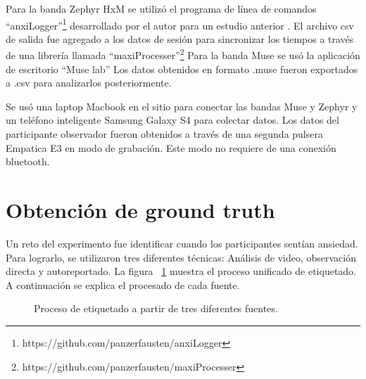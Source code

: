 Para la banda Zephyr HxM se utiliz\'o el programa de l\'inea de comandos ``anxiLogger''\footnote{https://github.com/panzerfausten/anxiLogger} desarrollado por el autor para un estudio anterior \citep{Miranda}. El archivo csv de salida fue agregado a los datos de sesi\'on para sincronizar los tiempos a trav\'es de una librer\'ia llamada ``maxiProcesser''\footnote{https://github.com/panzerfausten/maxiProcesser}
	Para la banda Muse se us\'o la aplicaci\'on de escritorio ``Muse lab'' Los datos obtenidos en formato .muse fueron exportados a .csv para analizarlos posteriormente.

	Se us\'o una laptop Macbook en el sitio para conectar las bandas Muse y Zephyr y un tel\'efono inteligente Samsung Galaxy S4 para colectar datos. Los datos del participante observador fueron obtenidos a trav\'es de una segunda pulsera Empatica E3 en modo de grabaci\'on. Este modo no requiere de una conexi\'on bluetooth.


\section{Obtenci\'on de ground truth}\label{secc:dataanalysis}
Un reto del experimento fue identificar cuando los participantes sent\'ian ansiedad. Para lograrlo, se utilizaron tres diferentes t\'ecnicas: An\'alisis de video, observaci\'on directa y autoreportado. La figura ~\ref{fig:labeling} muestra el proceso unificado de etiquetado. A continuaci\'on se explica el procesado de cada fuente.

\begin{figure}[h]
        \centering
	\caption{Proceso de etiquetado a partir de tres diferentes fuentes.}\label{fig:labeling}
\end{figure}
